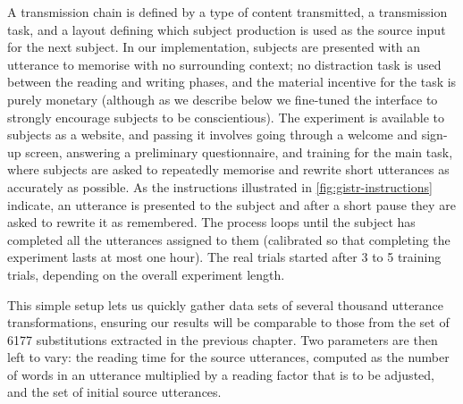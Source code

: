 \documentclass[a4paper,fleqn]{cas-dc}
\begin{document}
A transmission chain is defined by a type of content transmitted, a
transmission task, and a layout defining which subject production is
used as the source input for the next subject. In our implementation,
subjects are presented with an utterance to memorise with no surrounding
context; no distraction task is used between the reading and writing
phases, and the material incentive for the task is purely monetary
(although as we describe below we fine-tuned the interface to strongly
encourage subjects to be conscientious). The experiment is available to
subjects as a website, and passing it involves going through a welcome and sign-up screen, answering a preliminary questionnaire, and training for the main task, where subjects are asked to repeatedly
  memorise and rewrite short utterances as accurately as possible.
  As the instructions illustrated in \cref{fig:gistr-instructions}
  indicate, an utterance is presented to the subject and after a short
  pause they are asked to rewrite it as remembered. The process loops
  until the subject has completed all the utterances assigned to them
  (calibrated so that completing the experiment lasts at most one hour).
  The real trials started after 3 to 5 training trials, depending on the
  overall experiment length.

This simple setup lets us quickly gather data sets of several thousand
utterance transformations, ensuring our results will be comparable to
those from the set of \num{6177} substitutions extracted in the previous
chapter. Two parameters are then left to vary: the reading time for the
source utterances, computed as the number of words in an utterance
multiplied by a reading factor that is to be adjusted, and the set of
initial source utterances.
\end{document}
